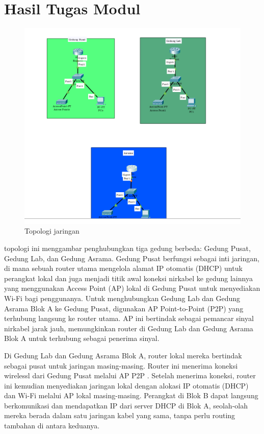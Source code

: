 \section{Hasil Tugas Modul}

    \begin{figure}[H]
        \centering
        \includegraphics[width=0.5\linewidth]{topologi.png}
        \caption{Topologi jaringan}
        \label{fig:ping-bridge}
    \end{figure}
topologi ini menggambar
penghubungkan tiga gedung berbeda: Gedung Pusat, Gedung Lab, dan Gedung Asrama. Gedung Pusat 
berfungsi sebagai inti jaringan, di mana sebuah router utama mengelola alamat IP otomatis (DHCP) 
untuk perangkat lokal dan juga menjadi titik awal koneksi nirkabel ke gedung lainnya yang
menggunakan Access Point (AP) lokal di Gedung Pusat untuk menyediakan Wi-Fi bagi penggunanya. 
Untuk menghubungkan Gedung Lab dan Gedung Asrama Blok A ke Gedung Pusat, digunakan AP  
Point-to-Point (P2P) yang terhubung langsung ke router utama. AP ini bertindak sebagai pemancar 
sinyal nirkabel jarak jauh, memungkinkan router di Gedung Lab dan Gedung Asrama Blok A untuk 
terhubung sebagai penerima sinyal.

Di Gedung Lab dan Gedung Asrama Blok A, router lokal mereka bertindak sebagai pusat untuk jaringan 
masing-masing. Router ini menerima koneksi wirelessl dari Gedung Pusat melalui AP P2P
. Setelah menerima koneksi, router ini kemudian menyediakan jaringan lokal dengan 
alokasi IP otomatis (DHCP) dan Wi-Fi melalui AP lokal masing-masing. Perangkat di Blok B dapat langsung berkomunikasi dan 
mendapatkan IP dari server DHCP di Blok A, seolah-olah mereka berada dalam satu jaringan kabel yang 
sama, tanpa perlu routing tambahan di antara keduanya.


